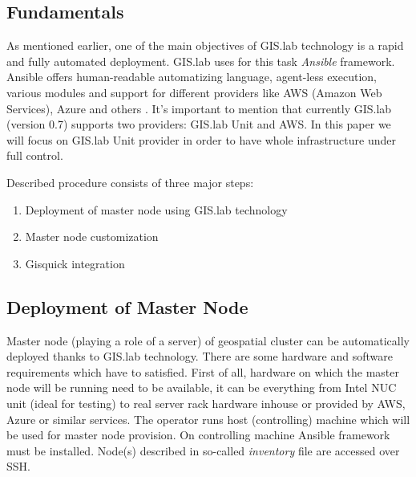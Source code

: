 \documentclass{isprs}
\begin{document}
\subsection{Fundamentals}

As mentioned earlier, one of the main objectives of GIS.lab technology
is a rapid and fully automated deployment. GIS.lab uses for this task
\textit{Ansible} framework. Ansible offers human-readable automatizing
language, agent-less execution, various modules and support for
different providers like AWS (Amazon Web Services), Azure and others
\cite{hochstein2014ansible}. It's important to mention that currently
GIS.lab (version 0.7) supports two providers: GIS.lab Unit and AWS. In
this paper we will focus on GIS.lab Unit provider in order to have
whole infrastructure under full control.

Described procedure consists of three major steps:

\begin{enumerate}
\setlength\itemsep{0em}\setlength\parskip{0em}\setlength\topsep{0em}\setlength\partopsep{0em}\setlength\parsep{0em}
\item{Deployment of master node using GIS.lab technology} 
\item{Master node customization}
\item{Gisquick integration}
\end{enumerate}

\subsection{Deployment of Master Node}\label{Deployment of Master Node}

Master node (playing a role of a server) of geospatial cluster can be
automatically deployed thanks to GIS.lab technology. There are some
hardware and software requirements which have to satisfied. First of
all, hardware on which the master node will be running need to be
available, it can be everything from Intel NUC unit (ideal for
testing) to real server rack hardware inhouse or provided by AWS,
Azure or similar services. The operator runs host (controlling)
machine which will be used for master node provision. On controlling
machine Ansible framework must be installed. Node(s) described in
so-called \textit{inventory} file are accessed over SSH.
\end{document}
